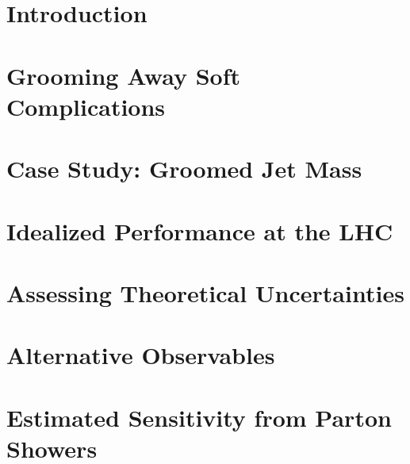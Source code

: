 \documentclass[11pt,letterpaper]{article}
\begin{document}
\maketitle

\section{Introduction}



\section{Grooming Away Soft Complications}
\label{sec:softcomplications}



\section{Case Study: Groomed Jet Mass}



\section{Idealized Performance at the LHC}



\section{Assessing Theoretical Uncertainties}



\section{Alternative Observables}



\section{Estimated Sensitivity from Parton Showers}
\end{document}
